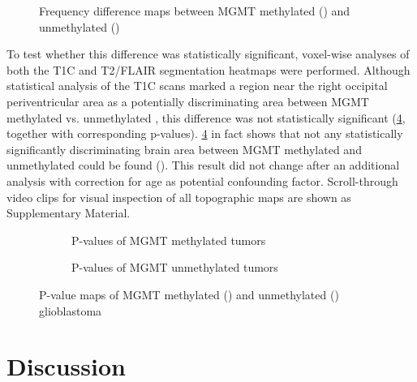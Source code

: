 \begin{figure}[htbp]
    \centering
    \caption{Frequency difference maps between \acrshort{MGMT} methylated () and unmethylated () }\label{fig:HGG_location_frequency_map}
\end{figure}

To test whether this difference was statistically significant, voxel-wise analyses of both the \gls{T1C} and \gls{T2}/\gls{FLAIR} segmentation heatmaps were performed.
Although statistical analysis of the \gls{T1C} scans marked a region near the right occipital periventricular area as a potentially discriminating area between \gls{MGMT} methylated vs. unmethylated , this difference was not statistically significant (\cref{fig:HGG_location_pvalue_map}, together with corresponding p-values).
\cref{fig:HGG_location_pvalue_map} in fact shows that not any statistically significantly discriminating brain area between \gls{MGMT} methylated and unmethylated  could be found ().
This result did not change after an additional analysis with correction for age as potential confounding factor.
Scroll-through video clips for visual inspection of all topographic maps are shown as Supplementary Material.

\begin{figure}[htbp]
    \centering
    \begin{subfigure}[b]{\textwidth}
        \centering
        \caption{P-values of \gls{MGMT} methylated \glspl{tumor}}\label{fig:HGG_location_pvalue_methylated}
    \end{subfigure}
    \begin{subfigure}[b]{\textwidth}
        \centering
        \caption{P-values of \gls{MGMT} unmethylated \glspl{tumor}}\label{fig:HGG_location_pvalue_unmethylated}
    \end{subfigure}
    \caption{P-value maps of \acrshort{MGMT} methylated () and unmethylated () glioblastoma}\label{fig:HGG_location_pvalue_map}
\end{figure}

\section{Discussion}

